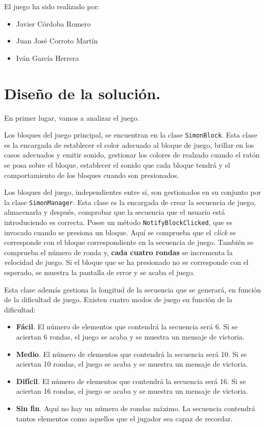 \documentclass{article}
\begin{document}
El juego ha sido realizado por:

\begin{itemize}
\item Javier Córdoba Romero
\item Juan José Corroto Martín
\item Iván García Herrera
\end{itemize}

\section{Diseño de la solución.}

En primer lugar, vamos a analizar el juego.

Los bloques del juego principal, se encuentran en la clase \texttt{SimonBlock}. Esta clase es la encargada de establecer el color adecuado al bloque de juego, brillar en los casos adecuados y emitir sonido, gestionar los colores de realzado cuando el ratón se posa sobre el bloque, establecer el sonido que cada bloque tendrá y el comportamiento de los bloques cuando son presionados.

\vspace*{0.15in}

Los bloques del juego, independientes entre sí, son gestionados en su conjunto por la clase \texttt{SimonManager}. Esta clase es la encargada de crear la secuencia de juego, almacenarla y después, comprobar que la secuencia que el usuario está introduciendo es correcta. Posee un método \texttt{NotifyBlockClicked}, que es invocado cuando se presiona un bloque. Aquí se comprueba que el \textit{click} se corresponde con el bloque correspondiente en la secuencia de juego. También se comprueba el número de ronda y, \textbf{cada cuatro rondas} se incrementa la velocidad de juego. Si el bloque que se ha presionado no se corresponde con el esperado, se muestra
la pantalla de error y se acaba el juego. 

Esta clase además gestiona la longitud de la secuencia que se generará, en función de la dificultad de juego. Existen cuatro modos de juego en función de la dificultad:

\begin{itemize}
\item \textbf{Fácil}. El número de elementos que contendrá la secuencia será 6. Si se aciertan 6 rondas, el juego se acaba y se muestra un mensaje de victoria.
\item \textbf{Medio}. El número de elementos que contendrá la secuencia será 10. Si se aciertan 10 rondas, el juego se acaba y se muestra un mensaje de victoria.
\item \textbf{Difícil}. El número de elementos que contendrá la secuencia será 16. Si se aciertan 16 rondas, el juego se acaba y se muestra un mensaje de victoria.
\item \textbf{Sin fin}. Aquí no hay un número de rondas máximo. La secuencia contendrá tantos elementos como aquellos que el jugador sea capaz de recordar. 
\end{itemize}
\end{document}
